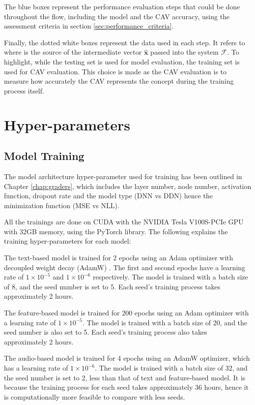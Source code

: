 The blue boxes represent the performance evaluation steps that could be done throughout the flow, including the model and the CAV accuracy, using the assessment criteria in section \ref{sec:performance_criteria}.

Finally, the dotted white boxes represent the data used in each step. It refers to where is the source of the intermediate vector $\mathbf{\hat{x}}$ passed into the system $\mathcal{F}$. To highlight, while the testing set is used for model evaluation, the training set is used for CAV evaluation. This choice is made as the CAV evaluation is to measure how accurately the CAV represents the concept during the training process itself.

\section{Hyper-parameters}
\subsection{Model Training}
The model architecture hyper-parameter used for training has been outlined in Chapter \ref{chap:graders}, which includes the layer number, node number, activation function, dropout rate and the model type (DNN vs DDN) hence the minimization function (MSE vs NLL).

All the trainings are done on CUDA with the NVIDIA Tesla V100S-PCIe GPU with 32GB memory, using the PyTorch library.  The following explains the training hyper-parameters for each model:

The text-based model is trained for 2 epochs using an Adam optimizer with decoupled weight decay (AdamW) . The first and second epochs have a learning rate of $1 \times 10^{-5}$ and $1 \times 10^{-6}$ respectively. The model is trained with a batch size of 8, and the seed number is set to 5. Each seed's training process takes approximately 2 hours.

The feature-based model is trained for 200 epochs using an Adam optimizer with a learning rate of $1 \times 10^{-5}$. The model is trained with a batch size of 20, and the seed number is also set to 5. Each seed's training process also takes approximately 2 hours.

The audio-based model is trained for 4 epochs using an AdamW optimizer, which has a learning rate of $1 \times 10^{-6}$. The model is trained with a batch size of 32, and the seed number is set to 2, less than that of text and feature-based model. It is because the training process for each seed takes approximately 36 hours, hence it is computationally more feasible to compare with less seeds.


